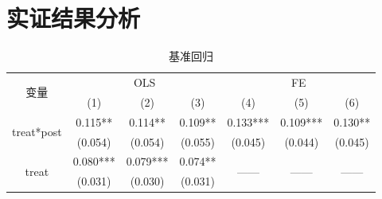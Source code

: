 \documentclass{beamer}	%
\theoremstyle{plain}
\theoremstyle{definition}
\theoremstyle{remark}
\numberwithin{equation}{section}
\begin{document}
\section{实证结果分析}
\begin{frame}
\begin{table}[htbp]
	\tiny
	\centering
	\caption{基准回归}
	\label{基准回归}
	\begin{tabular}{ccccccc}
		\toprule
		     \multirow{2}[4]{*}{变量}      &                                                           \multicolumn{3}{c}{OLS}                                                            &                                                             \multicolumn{3}{c}{FE}                                                              \\
		         \cmidrule{2-7}          &                      (1)                      &                      (2)                      &                     (3)                      &                      (4)                       &                      (5)                       &                      (6)                      \\ \midrule
		 \multirow{2}[1]{*}{treat*post}  & \textcolor[rgb]{1.000, 0.000, 0.000}{0.115**} & \textcolor[rgb]{1.000, 0.000, 0.000}{0.114**} & \textcolor[rgb]{1.000, 0.000, 0.000}{0.109**} & \textcolor[rgb]{1.000, 0.000, 0.000}{0.133***} & \textcolor[rgb]{1.000, 0.000, 0.000}{0.109***} & \textcolor[rgb]{1.000, 0.000, 0.000}{0.130**} \\
		                                 &                    (0.054)                    &                    (0.054)                    &                   (0.055)                    &                    (0.045)                     &                    (0.044)                     &                    (0.045)                    \\
		   \multirow{2}[0]{*}{treat}     &                   0.080***                    &                   0.079***                    &                   0.074**                    &             \multirow{2}[0]{*}{——}             &             \multirow{2}[0]{*}{——}             &            \multirow{2}[0]{*}{——}             \\
		                                 &                    (0.031)                    &                    (0.030)                    &                   (0.031)                    &                                                &                                                &                                               \\

\end{tabular}
\end{table}
\end{frame}
\end{document}
